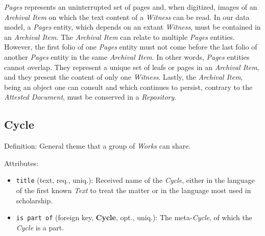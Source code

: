 \textit{Pages} represents an uninterrupted set of pages and, when digitized, images of an \textit{Archival Item} on which the text content of a \textit{Witness} can be read. In our data model, a \textit{Pages} entity, which depends on an extant \textit{Witness}, must be contained in an \textit{Archival Item}. The \textit{Archival Item} can relate to multiple \textit{Pages} entities. However, the first folio of one \textit{Pages} entity must not come before the last folio of another \textit{Pages} entity in the same \textit{Archival Item}. In other words, \textit{Pages} entities cannot overlap. They represent a unique set of leafs or pages in an \textit{Archival Item}, and they present the content of only one \textit{Witness}. Lastly, the \textit{Archival Item}, being an object one can consult and which continues to persist, contrary to the \textit{Attested Document}, must be conserved in a \textit{Repository}.


%         


\subsection{Cycle}

Definition: General theme that a group of \textit{Works} can share.  

\vspace{1em}
\noindent Attributes:
\begin{itemize}
    \item \texttt{title} (text, req., uniq.): Received name of the \textit{Cycle}, either in the language of the first known \textit{Text} to treat the matter or in the language most used in scholarship.
    \item \texttt{is part of} (foreign key, \textbf{Cycle}, opt., uniq.): The meta-\textit{Cycle}, of which the \textit{Cycle} is a part.
\end{itemize}

